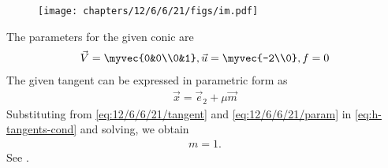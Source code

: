 	\begin{figure}[H]
		\centering
 \texttt{[image: chapters/12/6/6/21/figs/im.pdf]}
		\caption{}
		\label{fig:12/6/6/21}
  	\end{figure}
The parameters for the given conic are
\begin{align}
    \vec{V} = \myvec{0&0\\0&1}, \vec{u} = \myvec{-2\\0}, f = 0
		\label{eq:12/6/6/21/param}
\end{align}
The given tangent can be expressed in parametric form as
\begin{align}
		\label{eq:12/6/6/21/tangent}
\vec{x} = \vec{e}_2 + \mu\vec{m}
\end{align}
Substituting from 
		\eqref{eq:12/6/6/21/tangent}
		and
		\eqref{eq:12/6/6/21/param}
		in 
	  \eqref{eq:h-tangents-cond}
and solving, we obtain 
\begin{align}
	m = 1.
\end{align}
		See .
